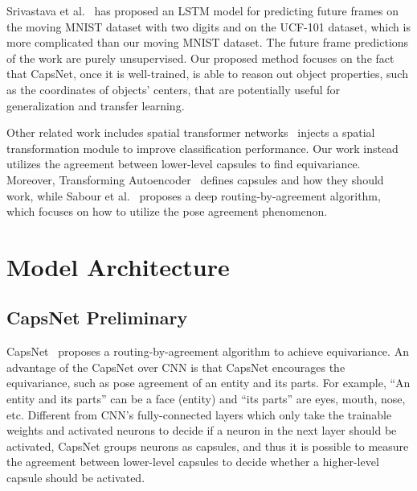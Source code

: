 \documentclass{article}
\begin{document}
Srivastava et al.~\cite{srivastava2015unsupervised} has proposed an LSTM model for predicting future frames on the moving MNIST dataset with two digits and on the UCF-101 dataset, which is more complicated than our moving MNIST dataset. The future frame predictions of the work are purely unsupervised. Our proposed method focuses on the fact that CapsNet, once it is well-trained, is able to reason out object properties, such as the coordinates of objects' centers, that are potentially useful for generalization and transfer learning. 

Other related work includes spatial transformer networks~\cite{jaderberg2015spatial} injects a spatial transformation module to improve classification performance. Our work instead utilizes the agreement between lower-level capsules to find equivariance. Moreover, Transforming Autoencoder~\cite{hinton2011transforming} defines capsules and how they should work, while Sabour et al.~\cite{sabour2017dynamic} proposes a deep routing-by-agreement algorithm, which focuses on how to utilize the pose agreement phenomenon. 

\section{Model Architecture}
\subsection{CapsNet Preliminary}
CapsNet~\cite{sabour2017dynamic} proposes a routing-by-agreement algorithm to achieve equivariance. An advantage of the CapsNet over CNN is that CapsNet encourages the equivariance, such as pose agreement of an entity and its parts. For example, ``An entity and its parts'' can be a face (entity) and ``its parts'' are eyes, mouth, nose, etc. Different from CNN's fully-connected layers which only take the trainable weights and activated neurons to decide if a neuron in the next layer should be activated, CapsNet groups neurons as capsules, and thus it is possible to measure the agreement between lower-level capsules to decide whether a higher-level capsule should be activated. 
\end{document}

